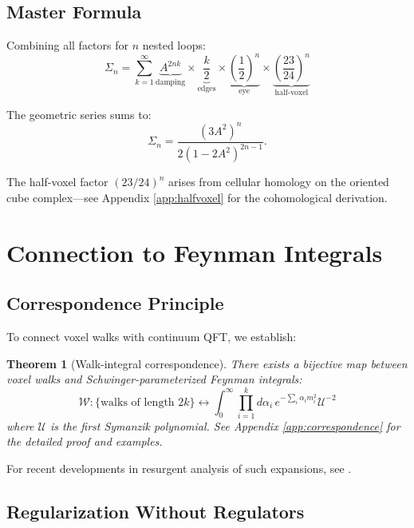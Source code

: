 \documentclass[11pt,a4paper]{article}
\newtheorem{theorem}{Theorem}
\theoremstyle{definition}
\theoremstyle{remark}
\begin{document}
\subsection{Master Formula}

Combining all factors for $n$ nested loops:
\begin{equation}
\label{eq:master}
\boxed{\Sigma_n = \sum_{k=1}^{\infty} \underbrace{A^{2nk}}_{\text{damping}} \times \underbrace{\frac{k}{2}}_{\text{edges}} \times \underbrace{\left(\frac{1}{2}\right)^n}_{\text{eye}} \times \underbrace{\left(\frac{23}{24}\right)^n}_{\text{half-voxel}}}
\end{equation}

The geometric series sums to:
\begin{equation}
\label{eq:closed}
\Sigma_n = \frac{(3A^2)^n}{2(1-2A^2)^{2n-1}}.
\end{equation}

The half-voxel factor $(23/24)^n$ arises from cellular homology on the oriented cube complex—see Appendix \ref{app:halfvoxel} for the cohomological derivation.

\section{Connection to Feynman Integrals}
\label{sec:feynman}

\subsection{Correspondence Principle}

To connect voxel walks with continuum QFT, we establish:

\begin{theorem}[Walk-integral correspondence]
\label{thm:correspondence}
There exists a bijective map between voxel walks and Schwinger-parameterized Feynman integrals:
\[
\mathcal{W}: \{\text{walks of length }2k\} \leftrightarrow \int_0^\infty \prod_{i=1}^k d\alpha_i \, e^{-\sum_i \alpha_i m_i^2} \mathcal{U}^{-2}
\]
where $\mathcal{U}$ is the first Symanzik polynomial. See Appendix \ref{app:correspondence} for the detailed proof and examples.
\end{theorem}

For recent developments in resurgent analysis of such expansions, see \cite{Aniceto2019,Dorigoni2019}.

\subsection{Regularization Without Regulators}
\end{document}
